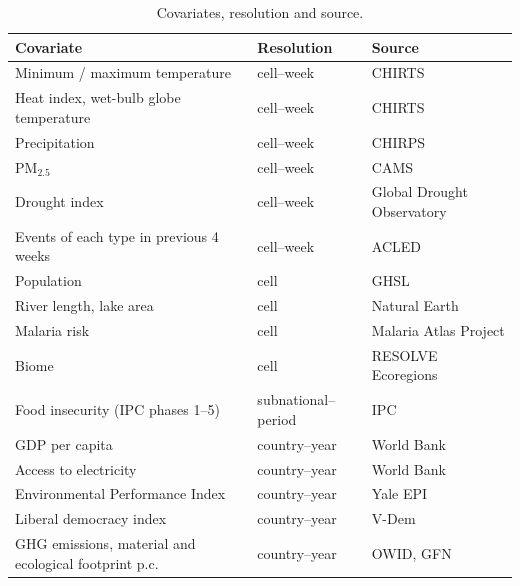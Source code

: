 \begin{table}
\caption{Covariates, resolution and source.}\label{tab:covariates}
\centering\small
\begin{tabular}{@{}lll@{}}
\toprule
Covariate & Resolution & Source \\
\midrule
Minimum / maximum temperature & cell--week & CHIRTS \\
Heat index, wet-bulb globe temperature & cell--week & CHIRTS \\
Precipitation & cell--week & CHIRPS \\
PM$_{2.5}$ & cell--week & CAMS \\
Drought index & cell--week & Global Drought Observatory \\
Events of each type in previous 4 weeks & cell--week & ACLED \\
Population & cell & GHSL \\
River length, lake area & cell & Natural Earth \\
Malaria risk & cell & Malaria Atlas Project \\
Biome & cell & RESOLVE Ecoregions \\
Food insecurity (IPC phases 1--5) & subnational--period & IPC \\
GDP per capita & country--year & World Bank \\
Access to electricity & country--year & World Bank \\
Environmental Performance Index & country--year & Yale EPI \\
Liberal democracy index & country--year & V-Dem \\
GHG emissions, material and ecological footprint p.c. & country--year & OWID, GFN \\
\bottomrule
\end{tabular}
\end{table}
